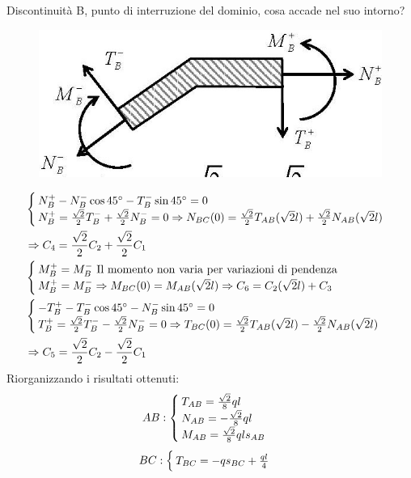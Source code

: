 \documentclass{article}
\begin{document}
\begin{adjustwidth}{2in}{}
	Discontinuità B, punto di interruzione del dominio, cosa accade nel suo intorno?
	\begin{figure}[H]
		\centering
		\includegraphics[width=0.3\linewidth]{"immagini/1.PARTE5_Pagina_23"}
	\end{figure}
	
	\[
	\begin{split}
		&\begin{cases}
			N^+_B - N^-_B\cos45\degree  - T^-_B\sin45\degree  = 0 \\
		N^+_B = {\sqrt{2}\over2}T^-_B + {\sqrt{2}\over2}N^-_B = 0  \Rightarrow N_{BC} (0)  = {\sqrt{2}\over2}T_{AB}(\sqrt{2}l) + {\sqrt{2}\over2}N_{AB}(\sqrt{2}l) 
		\end{cases} \\ & \Rightarrow  C_4  = {\sqrt{2}\over2}C_2 + {\sqrt{2}\over2}C_1 \\ 
		&\begin{cases}  
		M^+_B = M^-_B  ~ \text{Il momento non varia per variazioni di pendenza} \\			
		M^+_B = M^-_B   \Rightarrow M_{BC} (0)  = M_{AB}(\sqrt{2}l)  \Rightarrow  C_6 = C_2(\sqrt{2}l)+C_3
		\end{cases} \\
		&\begin{cases}
			-T^+_B - T^-_B\cos45\degree  - N^-_B\sin45\degree  = 0 \\	
		T^+_B = {\sqrt{2}\over2}T^-_B - {\sqrt{2}\over2}N^-_B = 0  \Rightarrow T_{BC} (0)  = {\sqrt{2}\over2}T_{AB}(\sqrt{2}l) - {\sqrt{2}\over2}N_{AB}(\sqrt{2}l)
		\end{cases} \\ & \Rightarrow C_5  = {\sqrt{2}\over2}C_2 - {\sqrt{2}\over2}C_1\\
	\end{split}
	\]
	 \newpage
		Riorganizzando i risultati ottenuti:
	\[
	AB: \begin{cases}
		T_{AB} = {\sqrt{2}\over8}ql \\
		
		N_{AB} = -{\sqrt{2}\over8}ql \\
		
		M_{AB} =  {\sqrt{2}\over8}qls_{AB}
	\end{cases}
	\] \hspace{0.5cm}
	\[
	BC: \begin{cases}
		T_{BC} = -qs_{BC} + {ql\over4} \\
		

\end{cases}\]
\end{adjustwidth}
\end{document}
